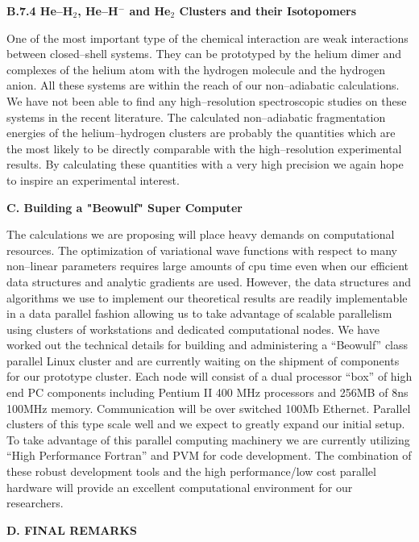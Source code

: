 \vspace{2mm}
\noindent
{\bf B.7.4
He--H$_2$, He--H$^-$ and He$_2$ Clusters and their Isotopomers}

One of the most important type of the chemical 
interaction 
are weak interactions between closed--shell systems.
They can be prototyped by the helium dimer and
complexes of the helium atom with the hydrogen molecule
and the hydrogen anion. All these systems are within
the reach of our non--adiabatic calculations.
We have not been able to find any high--resolution 
spectroscopic studies on these systems in the recent
literature. The calculated non--adiabatic
fragmentation energies of the
helium--hydrogen clusters 
are probably the quantities which  
are the most likely to be directly comparable 
with the high--resolution experimental results.    
By calculating these quantities with a very high
precision we again hope to inspire an experimental interest.  


\vspace{2mm}
\noindent
{\bf C. Building a "Beowulf" Super Computer}

The calculations we are proposing will place heavy demands on computational
resources. The optimization of variational wave functions with
respect to many non--linear parameters requires large amounts of
cpu time even when our efficient data structures and analytic gradients
are used. However, the data structures and algorithms we use to implement
our theoretical results are readily implementable in a data parallel fashion
allowing us to take advantage of scalable  parallelism using clusters
of workstations and dedicated computational nodes. We have worked out
the technical details for building and administering
a ``Beowulf''\cite{beowulfwww} class
parallel Linux cluster and are currently waiting on the shipment of
components for our prototype cluster. Each node
will consist of a dual processor ``box'' of high end
PC components including Pentium II 400 MHz processors and
256MB of 8ns 100MHz memory. Communication will be over
switched 100Mb Ethernet. Parallel clusters of this type
scale well and we expect to greatly expand our initial setup.
To take advantage of this parallel computing machinery we are  currently
utilizing ``High Performance Fortran'' \cite{HPFwww}
and PVM \cite{PVMwww} for code development. The combination of these
robust development tools and the high performance/low cost parallel hardware
will provide an excellent computational environment for our researchers.


\vspace{2mm}
\noindent
{\bf D. FINAL REMARKS}

